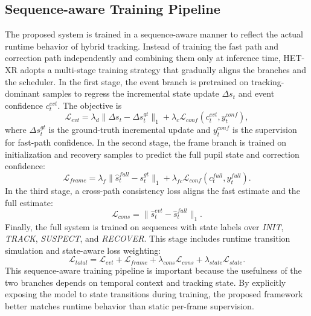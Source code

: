 \documentclass[journal]{IEEEtran}
\begin{document}
\subsection{Sequence-aware Training Pipeline}
The proposed system is trained in a sequence-aware manner to reflect the actual runtime behavior of hybrid tracking. Instead of training the fast path and correction path independently and combining them only at inference time, HET-XR adopts a multi-stage training strategy that gradually aligns the branches and the scheduler.
%
In the first stage, the event branch is pretrained on tracking-dominant samples to regress the incremental state update $\Delta s_t$ and event confidence $c_t^{evt}$. The objective is
\begin{equation}
\mathcal{L}_{evt} =
\lambda_{d}\|\Delta s_t - \Delta s_t^{gt}\|_1
+
\lambda_{c}\mathcal{L}_{conf}(c_t^{evt}, y_t^{conf}),
\end{equation}
where $\Delta s_t^{gt}$ is the ground-truth incremental update and $y_t^{conf}$ is the supervision for fast-path confidence.
%
In the second stage, the frame branch is trained on initialization and recovery samples to predict the full pupil state and correction confidence:
\begin{equation}
\mathcal{L}_{frame} =
\lambda_{f}\|\hat{s}_t^{full} - s_t^{gt}\|_1
+
\lambda_{fc}\mathcal{L}_{conf}(c_t^{full}, y_t^{full}).
\end{equation}
%
In the third stage, a cross-path consistency loss aligns the fast estimate and the full estimate:
\begin{equation}
\mathcal{L}_{cons} = \|\hat{s}_t^{evt} - \hat{s}_t^{full}\|_1.
\end{equation}
%
Finally, the full system is trained on sequences with state labels over \textit{INIT}, \textit{TRACK}, \textit{SUSPECT}, and \textit{RECOVER}. This stage includes runtime transition simulation and state-aware loss weighting:
\begin{equation}
\mathcal{L}_{total} =
\mathcal{L}_{evt} + \mathcal{L}_{frame}
+ \lambda_{cons}\mathcal{L}_{cons}
+ \lambda_{state}\mathcal{L}_{state}.
\end{equation}
%
This sequence-aware training pipeline is important because the usefulness of the two branches depends on temporal context and tracking state. By explicitly exposing the model to state transitions during training, the proposed framework better matches runtime behavior than static per-frame supervision.
%
\end{document}

